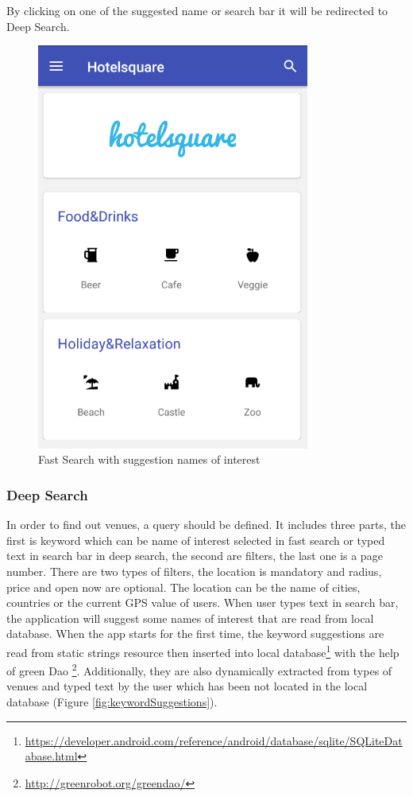  By clicking on one of the suggested name or search bar it will be redirected to Deep Search.
\begin{figure}[htbp]
	\includegraphics[width=0.8\textwidth]{images/fastsearch.png}
	\centering
	\caption[]{Fast Search with suggestion names of interest}
	\label{fig:fastsearch}
\end{figure} 
\subsubsection{Deep Search}

In order to find out venues, a query should be defined. It includes three parts, the first is keyword which can be name of interest selected in fast search or typed text in search bar in deep search, the second are filters, the last one is a page number. There are two types of filters, the location is mandatory and  radius, price and open now  are optional. The location can be the name of cities, countries or the current GPS value of users.
When user types text in search bar, the application will suggest some names of interest that are 
read from local database. When the app starts for the first time, the keyword suggestions  are read from static strings resource then inserted into local database\footnote{\url{https://developer.android.com/reference/android/database/sqlite/SQLiteDatabase.html}} with the help of green Dao \footnote{\url{http://greenrobot.org/greendao/}}. Additionally, they are also dynamically extracted from types of venues and typed text by the user which has been not located in the local database (Figure \ref{fig:keywordSuggestions}).

